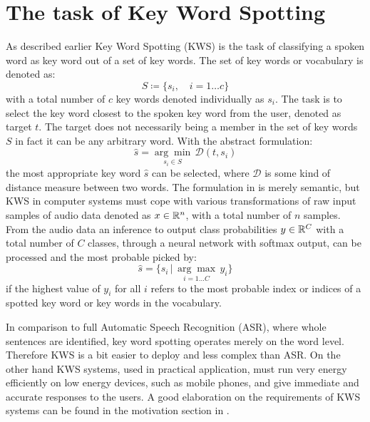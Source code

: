
\section{The task of Key Word Spotting}\label{sec:intro_kws}
\thesisStateReady
As described earlier Key Word Spotting (KWS) is the task of classifying a spoken word as key word out of a set of key words.
The set of key words or vocabulary is denoted as:
\begin{equation}\label{eq:intro_kws_dict}
	S \coloneqq \{s_i, \quad i=1 \dots c\}
\end{equation}
with a total number of $c$ key words denoted individually as $s_i$.
The task is to select the key word closest to the spoken key word from the user, denoted as target $t$.
The target does not necessarily being a member in the set of key words $S$ in fact it can be any arbitrary word.
With the abstract formulation:
\begin{equation}\label{eq:intro_kws_task}
	\hat{s} = \underset{s_i \in S}{\arg \min} \, \mathcal{D}(t, s_i)
\end{equation}
the most appropriate key word $\hat{s}$ can be selected, where $\mathcal{D}$ is some kind of distance measure between two words.
The formulation in  is merely semantic, but KWS in computer systems must cope with various transformations of raw input samples of audio data denoted as $x \in \mathbb{R}^n$, with a total number of $n$ samples.
From the audio data an inference to output class probabilities $y \in \mathbb{R}^C$ with a total number of $C$ classes, through a neural network with softmax output, can be processed and the most probable picked by:
\begin{equation}\label{eq:intro_kws_class}
	\hat{s} = \{s_i \, | \, \underset{i = 1 \dots C}{\arg \max} \, y_i\}
\end{equation}
if the highest value of $y_i$ for all $i$ refers to the most probable index or indices of a spotted key word or key words in the vocabulary.

In comparison to full Automatic Speech Recognition (ASR), where whole sentences are identified, key word spotting operates merely on the word level.
Therefore KWS is a bit easier to deploy and less complex than ASR.
On the other hand KWS systems, used in practical application, must run very energy efficiently on low energy devices, such as mobile phones, and give immediate and accurate responses to the users. 
A good elaboration on the requirements of KWS systems can be found in the motivation section in \cite{Warden2018}.

